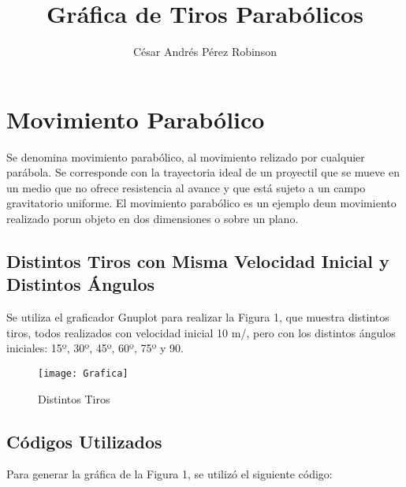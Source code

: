 \documentclass{article}
\title{Gráfica de Tiros Parabólicos}
\author{César Andrés Pérez Robinson}
\begin{document}
\maketitle

\section{Movimiento Parabólico}

Se denomina movimiento parabólico, al movimiento relizado por cualquier parábola. Se corresponde con la trayectoria ideal de un proyectil que se mueve en un medio que no ofrece resistencia al avance y que está sujeto a un campo gravitatorio uniforme. El movimiento parabólico es un ejemplo deun movimiento realizado porun objeto en dos dimensiones o sobre un plano.

\subsection{Distintos Tiros con Misma Velocidad Inicial y Distintos Ángulos}

Se utiliza el graficador Gnuplot para realizar la Figura 1, que muestra distintos tiros, todos realizados con velocidad inicial 10 m/, pero con los distintos ángulos iniciales: 15º, 30º, 45º, 60º, 75º y 90.

\begin{figure}

\texttt{[image: Grafica]}

\caption{Distintos Tiros}

\label{fig:Distintos Tiros1}

\end{figure}

\subsection{Códigos Utilizados}

Para generar la gráfica de la Figura 1, se utilizó el siguiente código:
\end{document}
